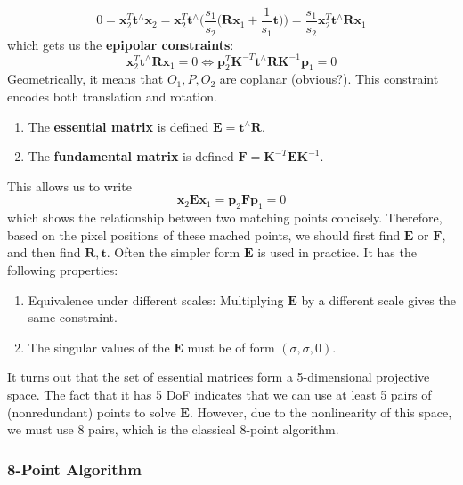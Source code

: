 \documentclass{article}
\theoremstyle{definition}
\theoremstyle{remark}
\theoremstyle{definition}
\begin{document}
\[0 = \mathbf{x}_2^T \mathbf{t}^\wedge \mathbf{x}_2 = \mathbf{x}_2^T \mathbf{t}^\wedge \bigg( \frac{s_1}{s_2} \big( \mathbf{R} \mathbf{x}_1 + \frac{1}{s_1} \mathbf{t} \big) \bigg) = \frac{s_1}{s_2} \mathbf{x}_2^T \mathbf{t}^\wedge \mathbf{R} \mathbf{x}_1\]
which gets us the \textbf{epipolar constraints}: 
\[\mathbf{x}_2^T \mathbf{t}^\wedge \mathbf{R} \mathbf{x}_1 = 0 \iff \mathbf{p}_2^T \mathbf{K}^{-T} \mathbf{t}^\wedge \mathbf{R} \mathbf{K}^{-1} \mathbf{p}_1 = 0\]
Geometrically, it means that $O_1, P, O_2$ are coplanar (obvious?). This constraint encodes both translation and rotation. 
\begin{enumerate}
    \item The \textbf{essential matrix} is defined $\mathbf{E} = \mathbf{t}^\wedge \mathbf{R}$. 
    \item The \textbf{fundamental matrix} is defined $\mathbf{F} = \mathbf{K}^{-T} \mathbf{E} \mathbf{K}^{-1}$. 
\end{enumerate}
This allows us to write 
\[\mathbf{x}_2 \mathbf{E} \mathbf{x}_1 = \mathbf{p}_2 \mathbf{F} \mathbf{p}_1 = 0\]
which shows the relationship between two matching points concisely. Therefore, based on the pixel positions of these mached points, we should first find $\mathbf{E}$ or $\mathbf{F}$, and then find $\mathbf{R}, \mathbf{t}$. Often the simpler form $\mathbf{E}$ is used in practice. It has the following properties: 
\begin{enumerate}
    \item Equivalence under different scales: Multiplying $\mathbf{E}$ by a different scale gives the same constraint. 
    \item The singular values of the $\mathbf{E}$ must be of form $(\sigma, \sigma, 0)$. 
\end{enumerate}
It turns out that the set of essential matrices form a 5-dimensional projective space. The fact that it has 5 DoF indicates that we can use at least 5 pairs of (nonredundant) points to solve $\mathbf{E}$. However, due to the nonlinearity of this space, we must use 8 pairs, which is the classical 8-point algorithm. 

\subsubsection{8-Point Algorithm}
\end{document}
